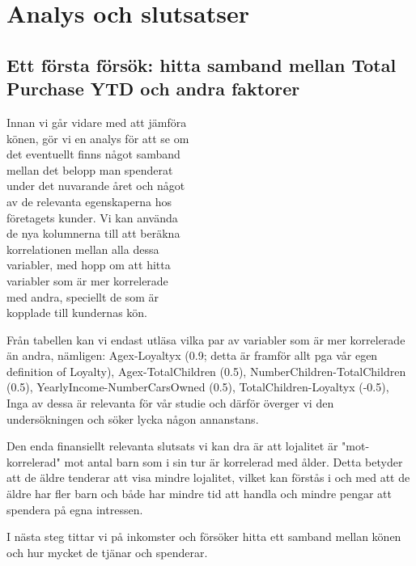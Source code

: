 \documentclass[]{article}
\begin{document}
\section{Analys och slutsatser}

\subsection{Ett första försök: hitta samband mellan Total Purchase YTD och andra faktorer}

Innan vi går vidare med att jämföra \\
könen, gör vi en analys för att se om \\
det eventuellt finns något samband \\
mellan det belopp man spenderat \\
under det nuvarande året och något \\
av de relevanta egenskaperna hos \\
företagets kunder. Vi kan använda \\
de nya kolumnerna till att beräkna \\
korrelationen mellan alla dessa \\
variabler, med hopp om att hitta \\
variabler som är mer korrelerade \\
med andra, speciellt de som är \\
kopplade till kundernas kön.

Från tabellen kan vi endast utläsa vilka par av variabler som är mer korrelerade än andra, nämligen: Agex-Loyaltyx (0.9; detta är framför allt pga vår egen definition of Loyalty), Agex-TotalChildren (0.5), NumberChildren-TotalChildren (0.5), YearlyIncome-NumberCarsOwned (0.5), TotalChildren-Loyaltyx (-0.5), Inga av dessa är relevanta för vår studie och därför överger vi den undersökningen och söker lycka någon annanstans.

Den enda finansiellt relevanta slutsats vi kan dra är att lojalitet är "mot-korrelerad" mot antal barn som i sin tur är korrelerad med ålder. Detta betyder att de äldre tenderar att visa mindre lojalitet, vilket kan förstås i och med att de äldre har fler barn och både har mindre tid att handla och mindre pengar att spendera på egna intressen.

I nästa steg tittar vi på inkomster och försöker hitta ett samband mellan könen och hur mycket de tjänar och spenderar.
\end{document}
